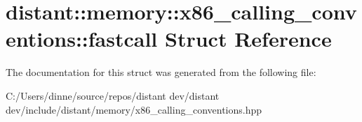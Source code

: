 \hypertarget{structdistant_1_1memory_1_1x86__calling__conventions_1_1fastcall}{}\section{distant\+:\+:memory\+:\+:x86\+\_\+calling\+\_\+conventions\+:\+:fastcall Struct Reference}
\label{structdistant_1_1memory_1_1x86__calling__conventions_1_1fastcall}


The documentation for this struct was generated from the following file\+:\begin{DoxyCompactItemize}
\item 
C\+:/\+Users/dinne/source/repos/distant dev/distant dev/include/distant/memory/x86\+\_\+calling\+\_\+conventions.\+hpp\end{DoxyCompactItemize}
